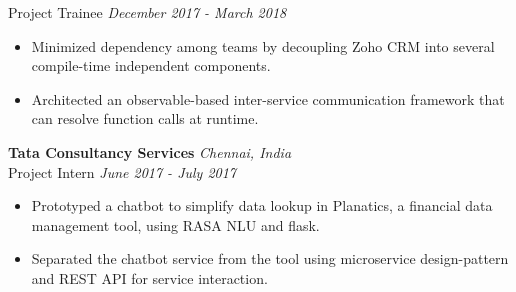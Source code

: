 \documentclass{resume}
\begin{document}
{\small Project Trainee} \hfill \textit{\small December 2017 - March 2018}
\begin{itemize}
  \item Minimized dependency among teams by decoupling Zoho CRM into several compile-time independent components.
  \item Architected an observable-based inter-service communication framework that can resolve function calls at runtime.
\end{itemize}
\textbf{Tata Consultancy Services} \hfill \textit{Chennai, India} \\
{\small Project Intern} \hfill \textit{\small June 2017 - July 2017}
\begin{itemize}
  \item Prototyped a chatbot to simplify data lookup in Planatics, a financial data management tool, using RASA NLU and flask.
  \item Separated the chatbot service from the tool using microservice design-pattern and REST API for service interaction.
\end{itemize}
\end{document}
